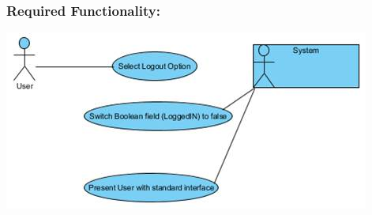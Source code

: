 \documentclass[a4paper,11pt]{article}
\begin{document}
\subsubsection{Required Functionality:} 
\includegraphics[width=1\linewidth]{./Images/CRUDThread/Diagrams/18.jpg}\\
\end{document}
